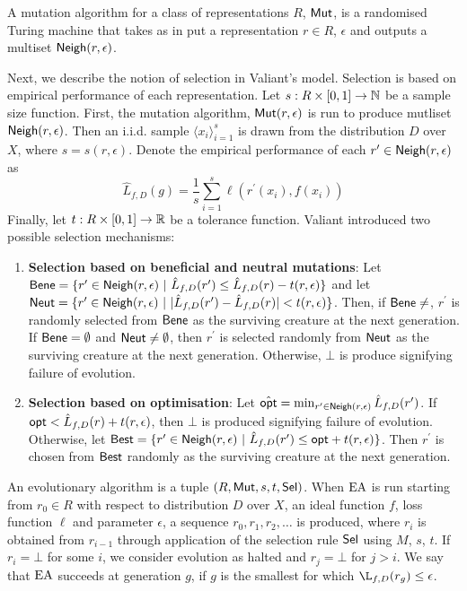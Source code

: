 A mutation algorithm for a class of representations $R$, $\mathsf{Mut}$, is a randomised
Turing machine that takes as in put a representation $r \in R$, $\epsilon$ and
outputs a multiset $\mathsf{Neigh}(r, \epsilon)$. 

Next, we describe the notion of selection in Valiant's model. Selection is based
on empirical performance of each representation. Let $s : R \times [0, 1]
\rightarrow \mathbb{N}$ be a sample size function. First, the mutation algorithm,
$\mathsf{Mut}(r, \epsilon)$ is run to produce mutliset $\mathsf{Neigh}(r, \epsilon)$. Then an i.i.d. sample
$\langle x_i \rangle_{i=1}^s$ is drawn from the distribution $D$ over $X$, where
$s = s(r, \epsilon)$.
Denote the empirical performance of each $r^\prime \in \mathsf{Neigh}(r, \epsilon)$ as
%
\[ \hat{L}_{f, D}(g) = \frac{1}{s}\sum_{i=1}^s \ell(r^\prime(x_i), f(x_i)) \]
%
Finally, let $t : R \times [0, 1] \rightarrow \mathbb{R}$ be a tolerance function. 
Valiant introduced two possible selection mechanisms: 
\begin{enumerate}
\item {\bf Selection based on beneficial and neutral mutations}: Let $\mathsf{Bene} =
\{r^\prime \in \mathsf{Neigh}(r, \epsilon) ~|~ \hat{L}_{f, D}(r^\prime) \leq \hat{L}_{f,
D}(r) - t(r, \epsilon) \}$ and let $\mathsf{Neut} = \{r^\prime \in \mathsf{Neigh}(r, \epsilon)
~|~ |\hat{L}_{f, D}(r^\prime) - \hat{L}_{f,
D}(r)| <  t(r, \epsilon) \}$. Then, if $\Bene \neq \empty$, $r^\prime$ is
randomly selected from $\mathsf{Bene}$ as the surviving creature at the next generation.
If $\mathsf{Bene} = \emptyset$ and $\mathsf{Neut} \neq\emptyset$, then $r^\prime$ is selected
randomly from $\mathsf{Neut}$ as the surviving creature at the next generation.
Otherwise, $\bot$ is produce signifying failure of evolution.
\item {\bf Selection based on optimisation}: Let $\hat{\mathsf{opt}} = \min_{r^\prime
\in \mathsf{Neigh}(r, \epsilon)} \hat{L}_{f, D}(r^\prime)$. If $\mathsf{opt} < \hat{L}_{f, D}(r)
+ t(r, \epsilon)$, then $\bot$ is produced signifying failure of evolution.
Otherwise, let $\mathsf{Best} = \{ r^\prime \in
\mathsf{Neigh}(r, \epsilon) ~|~ \hat{L}_{f, D}(r^\prime) \leq \mathsf{opt} + t(r, \epsilon) \}$.
Then $r^\prime$ is chosen from $\mathsf{Best}$ randomly as the surviving creature at the
next generation.
\end{enumerate}

An evolutionary algorithm is a tuple $(R, \mathsf{Mut}, s, t, \mathsf{Sel})$. When $\mathrm{EA}$ is
run starting from $r_0 \in R$ with respect to distribution $D$ over $X$, an
ideal function $f$, loss function $\ell$ and parameter $\epsilon$, a sequence
$r_0, r_1, r_2, \ldots$ is produced, where $r_i$ is obtained from $r_{i-1}$
through application of the selection rule $\mathsf{Sel}$ using $M$, $s$, $t$. If $r_i =
\bot$ for some $i$, we consider evolution as halted and $r_j = \bot$ for $j >
i$. We say that $\mathrm{EA}$ succeeds at generation $g$, if $g$ is the smallest for
which $\L_{f, D}(r_g) \leq \epsilon$.

